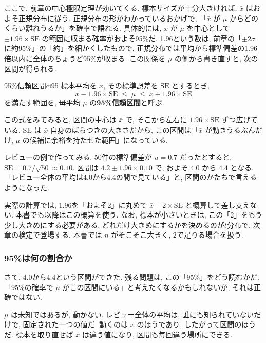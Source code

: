     ここで, 前章の中心極限定理が効いてくる.
    標本サイズが十分大きければ, $\bar{x}$ はおよそ正規分布に従う.
    正規分布の形がわかっているおかげで, 「$\bar{x}$ が $\mu$ からどのくらい離れうるか」を確率で語れる.
    具体的には, $\bar{x}$ が $\mu$ を中心として $\pm 1.96 \times \mathrm{SE}$ の範囲に収まる確率がおよそ95\%だ.
    1.96という数は, 前章の「$\pm 2\sigma$ に約95\%」の「約」を細かくしたもので, 正規分布では平均から標準偏差の1.96倍以内に全体のちょうど95\%が収まる.
    この関係を $\mu$ の側から書き直すと, 次の区間が得られる.

\begin{defi}{95\%信頼区間}{ci95}
  標本平均を $\bar{x}$, その標準誤差を $\mathrm{SE}$ とするとき,
  \[
    \bar{x} - 1.96 \times \mathrm{SE} \;\leq\; \mu \;\leq\; \bar{x} + 1.96 \times \mathrm{SE}
  \]
  を満たす範囲を, 母平均 $\mu$ の\textbf{95\%信頼区間}と呼ぶ.
\end{defi}

    この式をみてみると, 区間の中心は $\bar{x}$ で, そこから左右に $1.96 \times \mathrm{SE}$ ずつ広げている.
    $\mathrm{SE}$ は $\bar{x}$ 自身のばらつきの大きさだから, この区間は「$\bar{x}$ が動きうるぶんだけ, $\mu$ の候補に余裕を持たせた範囲」になっている.

    レビューの例で作ってみる.
    50件の標準偏差が $u = 0.7$ だったとすると, $\mathrm{SE} = 0.7/\sqrt{50} \approx 0.10$.
    区間は $4.2 \pm 1.96 \times 0.10$ で, およそ $4.0$ から $4.4$ となる.
    「レビュー全体の平均は4.0から4.4の間で見ている」と, 区間のかたちで言えるようになった.

    実際の計算では, 1.96を「およそ2」に丸めて $\bar{x} \pm 2 \times \mathrm{SE}$ と概算して差し支えない.
    本書でも以降はこの概算を使う.
    なお, 標本が小さいときは, この「2」をもう少し大きめにする必要がある.
    どれだけ大きめにするかを決めるのが$t$分布で, 次章の検定で登場する.
    本書では $n$ がそこそこ大きく, 2で足りる場合を扱う.

    \subsubsection*{95\%は何の割合か}

    さて, 4.0から4.4という区間ができた.
    残る問題は, この「95\%」をどう読むかだ.
    「95\%の確率で $\mu$ がこの区間にいる」と考えたくなるかもしれないが, それは正確ではない.

    $\mu$ は未知ではあるが, 動かない.
    レビュー全体の平均は, 誰にも知られていないだけで, 固定された一つの値だ.
    動くのは $\bar{x}$ のほうであり, したがって区間のほうだ.
    標本を取り直せば $\bar{x}$ は違う値になり, 区間も毎回違う場所にできる.

